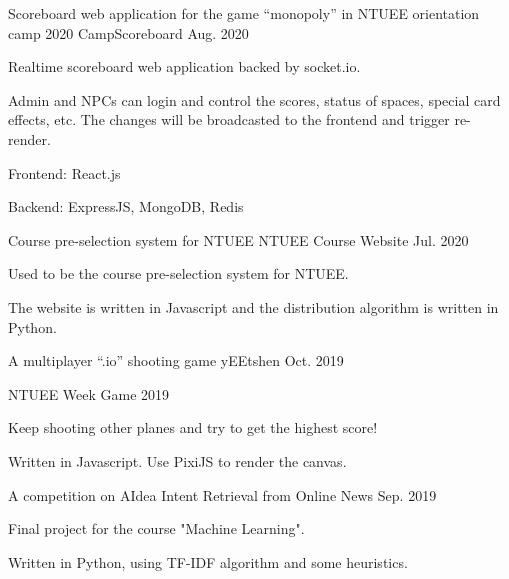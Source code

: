 \begin{cventries}
  \cventry
    {Scoreboard web application for the game “monopoly” in NTUEE orientation camp 2020}
    {CampScoreboard \href{https://github.com/MortalHappiness/CampScoreboard}{\color{red}{[Github Link]}}}
    {}
    {Aug. 2020} %
    {
      \begin{cvitems} %
        \item {Realtime scoreboard web application backed by socket.io.}
        \item {Admin and NPCs can login and control the scores, status of spaces, special card effects, etc. The changes will be broadcasted to the frontend and trigger re-render.}
        \item {Frontend: React.js}
        \item {Backend: ExpressJS, MongoDB, Redis}
      \end{cvitems}
    }

  \cventry
    {Course pre-selection system for NTUEE}
    {NTUEE Course Website \href{https://github.com/NTUEEInfoDep/NTUEECourseWebsite2020}{\color{red}{[Github Link]}}}
    {}
    {Jul. 2020} %
    {
      \begin{cvitems} %
        \item {Used to be the course pre-selection system for NTUEE.}
        \item {The website is written in Javascript and the distribution algorithm is written in Python.}
      \end{cvitems}
    }

  \cventry
    {A multiplayer “.io” shooting game}
    {yEEtshen \href{https://github.com/NTUEEInfoDep/yEEtshen}{\color{red}{[Github Link]}}}
    {}
    {Oct. 2019} %
    {
      \begin{cvitems} %
      	\item {NTUEE Week Game 2019}
        \item {Keep shooting other planes and try to get the highest score!}
        \item {Written in Javascript. Use PixiJS to render the canvas.}
      \end{cvitems}
    }
    
  \cventry
    {A competition on AIdea}
    {Intent Retrieval from Online News \href{https://github.com/jill880829/ML2019SPRING/tree/master/final}{\color{red}{[Github Link]}}}
    {}
    {Sep. 2019} %
    {
      \begin{cvitems} %
        \item {Final project for the course "Machine Learning".
}
        \item {Written in Python, using TF-IDF algorithm and some heuristics.}
      \end{cvitems}
    }
    
\end{cventries}
